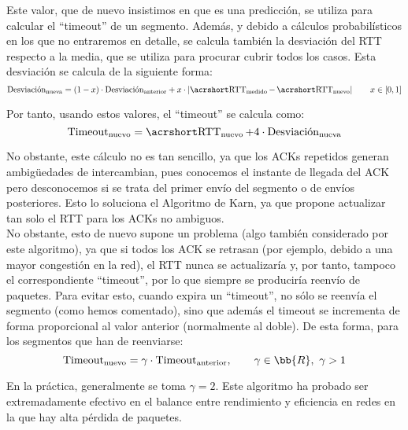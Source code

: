 Este valor, que de nuevo insistimos en que es una predicción, se utiliza para calcular el ``timeout'' de un segmento. Además, y debido a cálculos probabilísticos en los que no entraremos en detalle, se calcula también la desviación del \acrshort{RTT} respecto a la media, que se utiliza para procurar cubrir todos los casos. Esta desviación se calcula de la siguiente forma:
\begin{equation*}
    \text{Desviación}_{\text{nueva}} = (1-x) \cdot \text{Desviación}_{\text{anterior}} + x \cdot \left|\rtt_{\text{medido}} - \rtt_{\text{nuevo}}\right|
    \qquad x \in [0,1]
\end{equation*}

Por tanto, usando estos valores, el ``timeout'' se calcula como:
\begin{equation*}
    \text{Timeout}_{\text{nuevo}} = \rtt_{\text{nuevo}} + 4 \cdot \text{Desviación}_{\text{nueva}}
\end{equation*}

No obstante, este cálculo no es tan sencillo, ya que los \acrshort{ACK}s repetidos generan ambigüedades de intercambian, pues conocemos el instante de llegada del \acrshort{ACK} pero desconocemos si se trata del primer envío del segmento o de envíos posteriores. Esto lo soluciona el Algoritmo de Karn, ya que propone actualizar tan solo el \acrshort{RTT} para los \acrshort{ACK}s no ambiguos.\\

No obstante, esto de nuevo supone un problema (algo también considerado por este algoritmo), ya que si todos los \acrshort{ACK} se retrasan (por ejemplo, debido a una mayor congestión en la red), el \acrshort{RTT} nunca se actualizaría y, por tanto, tampoco el correspondiente ``timeout'', por lo que siempre se produciría reenvío de paquetes. Para evitar esto, cuando expira un ``timeout'', no sólo se reenvía el segmento (como hemos comentado), sino que además el timeout se incrementa de forma proporcional al valor anterior (normalmente al doble). De esta forma, para los segmentos que han de reenviarse:
\begin{equation*}
    \text{Timeout}_{\text{nuevo}} = \gamma \cdot \text{Timeout}_{\text{anterior}},\qquad \gamma\in \bb{R},\ \gamma > 1
\end{equation*}

En la práctica, generalmente se toma $\gamma = 2$. Este algoritmo ha probado ser extremadamente efectivo en el balance entre rendimiento y eficiencia en redes en la que hay alta pérdida de paquetes.

